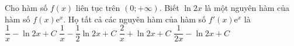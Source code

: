 \begin{ex}%
Cho hàm số $f(x)$ liên tục trên $(0;+\infty)$. Biết $\ln 2x$ là một nguyên hàm của hàm số $f(x)\mathrm{e}^x$. Họ tất cả các nguyên hàm của hàm số $f'(x)\mathrm{e}^x$ là	
	\choice
	{\True $\dfrac{1}{x}-\ln 2x+C$}
{$\dfrac{1}{x}-\dfrac{1}{2}\ln 2x+C$}
	{$\dfrac{2}{x}+\ln 2x+C$}
	{$\dfrac{1}{2x}-\ln 2x+C$}
\end{ex}

